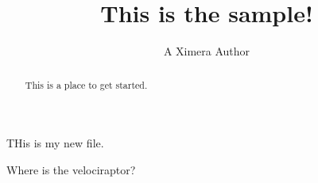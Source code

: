 \documentclass[handout]{ximera}
\title{This is the sample!}
\author{A Ximera Author}
\begin{document}
\begin{abstract}
  This is a place to get started.
\end{abstract}


\maketitle

THis is my new file.

\begin{problem} Where is the velociraptor?
\begin{multipleChoice}
\end{multipleChoice}
\end{problem}

\begin{problem}
\begin{selectAll}
\end{selectAll}
\end{problem}



\end{document}
